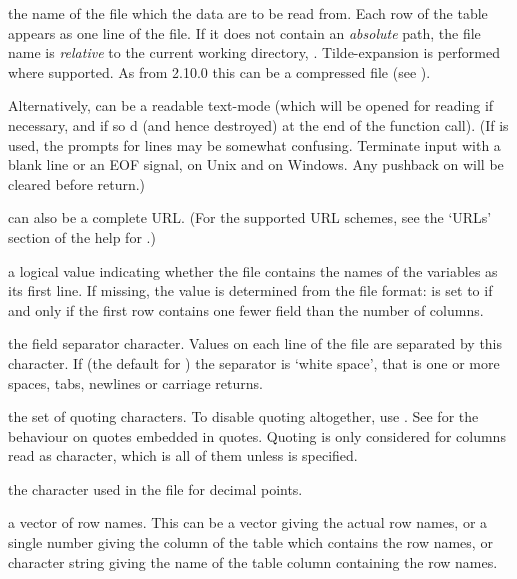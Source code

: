 %
\begin{Arguments}
\begin{ldescription}
\item[\code{file}] the name of the file which the data are to be read from.
Each row of the table appears as one line of the file.  If it does
not contain an \emph{absolute} path, the file name is
\emph{relative} to the current working directory,
. Tilde-expansion is performed where supported.
As from \R{} 2.10.0 this can be a compressed file (see ).

Alternatively,  can be a readable text-mode
 (which will be opened for reading if
necessary, and if so d (and hence destroyed) at
the end of the function call).  (If  is used,
the prompts for lines may be somewhat confusing.  Terminate input
with a blank line or an EOF signal,  on Unix and
 on Windows.  Any pushback on  will be
cleared before return.)

 can also be a complete URL.  (For the supported URL
schemes, see the `URLs' section of the help for
.)


\item[\code{header}] a logical value indicating whether the file contains the
names of the variables as its first line.  If missing, the value is
determined from the file format:  is set to 
if and only if the first row contains one fewer field than the
number of columns.

\item[\code{sep}] the field separator character.  Values on each line of the
file are separated by this character.  If  (the
default for ) the separator is `white space',
that is one or more spaces, tabs, newlines or carriage returns.

\item[\code{quote}] the set of quoting characters. To disable quoting
altogether, use .  See  for the
behaviour on quotes embedded in quotes.  Quoting is only considered
for columns read as character, which is all of them unless
 is specified.

\item[\code{dec}] the character used in the file for decimal points.

\item[\code{row.names}] a vector of row names.  This can be a vector giving
the actual row names, or a single number giving the column of the
table which contains the row names, or character string giving the
name of the table column containing the row names.


\end{ldescription}
\end{Arguments}
